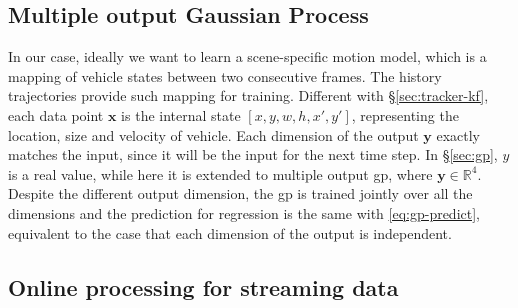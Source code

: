 \subsection{Multiple output Gaussian Process}

In our case, ideally we want to learn a scene-specific motion model, which is a mapping of vehicle states between two consecutive frames. 
The history trajectories provide such mapping for training. 
Different with \S\ref{sec:tracker-kf}, each data point $\mathbf{x}$ is the internal state $[x, y, w, h, x', y']$, 
representing the location, size and velocity of vehicle. 
Each dimension of the output $\mathbf{y}$ exactly matches the input, since it will be the input for the next time step.
In \S\ref{sec:gp}, $y$ is a real value, while here it is extended to multiple output \gls{gp}, where $\mathbf{y} \in \mathbb{R}^{4}$. 
Despite the different output dimension, the \gls{gp} is trained jointly over all the dimensions and the prediction for regression is the same with \ref{eq:gp-predict}, equivalent to the case that each dimension of the output is independent.

\subsection{Online processing for streaming data}




